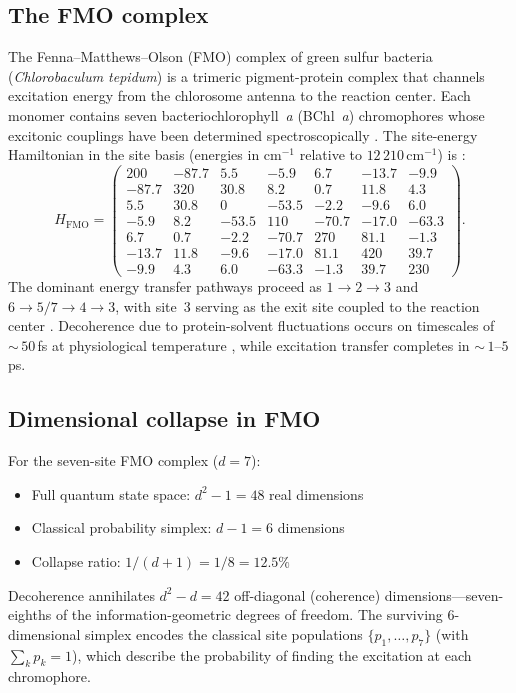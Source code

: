 \documentclass[12pt,a4paper]{article}
\theoremstyle{definition}
\theoremstyle{remark}
\begin{document}
\subsection{The FMO complex}
\label{sec:fmo-complex}

The Fenna--Matthews--Olson (FMO) complex of green sulfur bacteria (\textit{Chlorobaculum tepidum}) is a trimeric pigment-protein complex that channels excitation energy from the chlorosome antenna to the reaction center. Each monomer contains seven bacteriochlorophyll~\textit{a} (BChl~\textit{a}) chromophores whose excitonic couplings have been determined spectroscopically \cite{adolphs2006proteins}. The site-energy Hamiltonian in the site basis (energies in cm$^{-1}$ relative to $12\,210$\,cm$^{-1}$) is \cite{adolphs2006proteins}:
\begin{equation}
\label{eq:fmo-hamiltonian}
H_{\mathrm{FMO}} = \begin{pmatrix}
200 & -87.7 & 5.5 & -5.9 & 6.7 & -13.7 & -9.9 \\
-87.7 & 320 & 30.8 & 8.2 & 0.7 & 11.8 & 4.3 \\
5.5 & 30.8 & 0 & -53.5 & -2.2 & -9.6 & 6.0 \\
-5.9 & 8.2 & -53.5 & 110 & -70.7 & -17.0 & -63.3 \\
6.7 & 0.7 & -2.2 & -70.7 & 270 & 81.1 & -1.3 \\
-13.7 & 11.8 & -9.6 & -17.0 & 81.1 & 420 & 39.7 \\
-9.9 & 4.3 & 6.0 & -63.3 & -1.3 & 39.7 & 230
\end{pmatrix}.
\end{equation}
The dominant energy transfer pathways proceed as $1 \to 2 \to 3$ and $6 \to 5/7 \to 4 \to 3$, with site~3 serving as the exit site coupled to the reaction center \cite{adolphs2006proteins,cao2020quantum}. Decoherence due to protein-solvent fluctuations occurs on timescales of ${\sim}\,50$\,fs at physiological temperature \cite{cao2020quantum}, while excitation transfer completes in ${\sim}\,1$--$5$\,ps.

\subsection{Dimensional collapse in FMO}
\label{sec:fmo-collapse}

For the seven-site FMO complex ($d = 7$):
\begin{itemize}
\item Full quantum state space: $d^2 - 1 = 48$ real dimensions
\item Classical probability simplex: $d - 1 = 6$ dimensions
\item Collapse ratio: $1/(d+1) = 1/8 = 12.5\%$
\end{itemize}
Decoherence annihilates $d^2 - d = 42$ off-diagonal (coherence) dimensions---seven-eighths of the information-geometric degrees of freedom. The surviving 6-dimensional simplex encodes the classical site populations $\{p_1, \ldots, p_7\}$ (with $\sum_k p_k = 1$), which describe the probability of finding the excitation at each chromophore.
\end{document}
